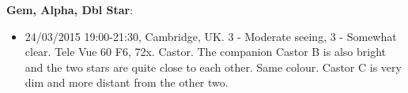 {\bf Gem, Alpha, Dbl Star}:
\begin{itemize}
\item 24/03/2015 19:00-21:30, Cambridge, UK. 3 - Moderate seeing, 3 - Somewhat clear. Tele Vue 60 F6, 72x. Castor. The companion Castor B is also bright and the two stars are quite close to each other. Same colour. Castor C is very dim and more distant from the other two.
\end{itemize}
